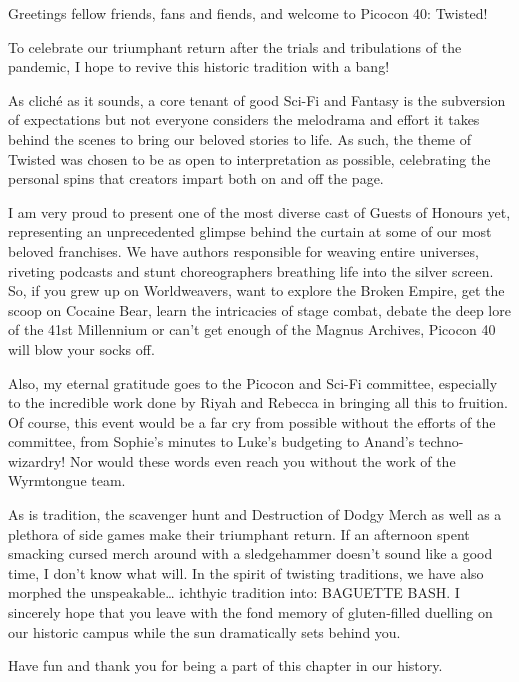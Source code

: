 Greetings fellow friends, fans and fiends, and welcome to Picocon 40: Twisted!

To celebrate our triumphant return after the trials and tribulations of the pandemic,  I hope to revive this historic tradition with a bang!

As cliché as it sounds, a core tenant of good Sci-Fi and Fantasy is the subversion of expectations but not everyone considers the melodrama and effort it takes behind the scenes to bring our beloved stories to life. As such, the theme of Twisted was chosen to be as open to interpretation as possible, celebrating the personal spins that creators impart both on and off the page. 

I am very proud to present one of the most diverse cast of Guests of Honours yet, representing an unprecedented glimpse behind the curtain at some of our most beloved franchises. We have authors responsible for weaving entire universes, riveting podcasts and stunt choreographers breathing life into the silver screen. So, if you grew up on Worldweavers, want to explore the Broken Empire, get the scoop on Cocaine Bear, learn the intricacies of stage combat, debate the deep lore of the 41st Millennium or can't get enough of the Magnus Archives, Picocon 40 will blow your socks off.

Also, my eternal gratitude goes to the Picocon and Sci-Fi committee, especially to the incredible work done by Riyah and Rebecca in bringing all this to fruition. Of course, this event would be a far cry from possible without the efforts of the committee, from Sophie’s minutes to Luke’s budgeting to Anand’s techno-wizardry! Nor would these words even reach you without the work of the Wyrmtongue team.

As is tradition, the scavenger hunt and Destruction of Dodgy Merch as well as a plethora of side games make their triumphant return. If an afternoon spent smacking cursed merch around with a sledgehammer doesn’t sound like a good time, I don’t know what will. In the spirit of twisting traditions, we have also morphed the unspeakable… ichthyic tradition into: BAGUETTE BASH. I sincerely hope that you leave with the fond memory of gluten-filled duelling on our historic campus while the sun dramatically sets behind you. 

Have fun and thank you for being a part of this chapter in our history.
